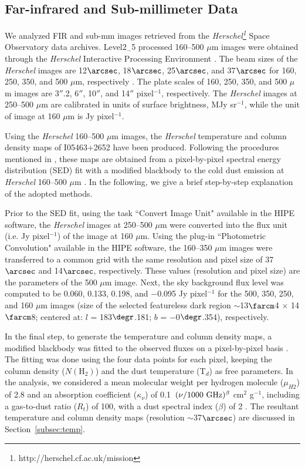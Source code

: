 \documentclass[iop]{emulateapj}
\begin{document}
\subsection{Far-infrared and Sub-millimeter Data}
%
We analyzed FIR and sub-mm images retrieved from the {\it Herschel\footnote[5]{http://herschel.cf.ac.uk/mission}} Space Observatory \citep{pilbratt10,poglitsch10,griffin10,degraauw10} data archives. 
Level2$_{-}$5 processed 160--500 $\mu$m images were obtained through the {\it Herschel} Interactive Processing Environment \citep[HIPE,][]{ott10}. 
The beam sizes of the {\it Herschel} images are 12$\arcsec$, 18$\arcsec$, 25$\arcsec$, and 37$\arcsec$ for 160, 250, 350, and 500 $\mu$m, respectively \citep{poglitsch10,griffin10}. 
The plate scales of 160, 250, 350, and 500 $\mu$m images are 3$''$.2, 6$''$, 10$''$, and 14$''$ pixel$^{-1}$, respectively.  
The {\it Herschel} images at 250--500 $\mu$m are calibrated in units of surface brightness, MJy sr$^{-1}$, while the unit of image at 160 $\mu$m 
is Jy pixel$^{-1}$. 

Using the {\it Herschel} 160--500 $\mu$m images, the {\it Herschel} temperature and column density maps of I05463+2652 have been produced. 
Following the procedures mentioned in \citet{mallick15}, these maps are obtained from a 
pixel-by-pixel spectral energy distribution (SED) fit with a modified blackbody to the cold dust emission at {\it Herschel} 160--500 $\mu$m \citep[also see][]{dewangan15}. 
In the following, we give a brief step-by-step explanation of the adopted methods. 

Prior to the SED fit, using the task ``Convert Image Unit" available in the HIPE software, the {\it Herschel} images at 250--500 $\mu$m were 
converted into the flux unit (i.e. Jy pixel$^{-1}$) of the image at 160 $\mu$m. 
Using the plug-in ``Photometric Convolution" available in the HIPE software, the 160--350 $\mu$m images were transferred 
to a common grid with the same resolution and pixel size of 37$\arcsec$ and 14$\arcsec$, respectively.
These values (resolution and pixel size) are the parameters of the 500 $\mu$m image.
Next, the sky background flux level was computed to be 0.060, 0.133, 0.198, and $-$0.095 Jy pixel$^{-1}$ for the 500, 350, 250, and 
160 $\mu$m images (size of the selected featureless dark region $\sim$13$\farcm$4 $\times$ 14$\farcm$8; 
centered at:  $l$ = 183$\degr$.181; $b$ = $-$0$\degr$.354), respectively. 

In the final step, to generate the temperature and column density maps, a modified blackbody was fitted to the observed fluxes on a pixel-by-pixel basis 
\citep[see equations 8 and 9 in][]{mallick15}. 
The fitting was done using the four data points for each pixel, keeping the column density ($N(\mathrm H_2)$) and the 
dust temperature (T$_{d}$) as free parameters. 
In the analysis, we considered a mean molecular weight per hydrogen molecule ($\mu_{H2}$) of 2.8 
\citep{kauffmann08} and an absorption coefficient ($\kappa_\nu$) of 0.1~$(\nu/1000~{\rm GHz})^{\beta}$ cm$^{2}$ g$^{-1}$, 
including a gas-to-dust ratio ($R_t$) of 100, with a dust spectral index ($\beta$) of 2 \citep[see][]{hildebrand83}. 
The resultant temperature and column density maps (resolution $\sim$37$\arcsec$) are discussed in Section~\ref{subsec:temp}.
%
\end{document}
